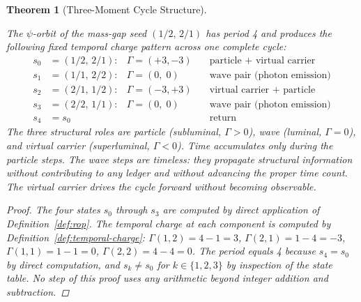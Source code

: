 \documentclass[11pt, letterpaper]{article}
\newcommand{\Tcharge}{\Gamma}
\theoremstyle{definition}
\theoremstyle{plain}
\newtheorem{theorem}{Theorem}[section]
\begin{document}
\begin{theorem}[Three-Moment Cycle Structure]\label{thm:three-moment}
\begin{rsbox}
The $\psi$-orbit of the mass-gap seed $(1/2,\, 2/1)$ has period 4 and produces
the following fixed temporal charge pattern across one complete cycle:
\begin{align*}
s_0 &= (1/2,\, 2/1): & \Tcharge = (+3, -3) & \quad \text{particle + virtual carrier} \\
s_1 &= (1/1,\, 2/2): & \Tcharge = (0,\; 0) & \quad \text{wave pair (photon emission)} \\
s_2 &= (2/1,\, 1/2): & \Tcharge = (-3, +3) & \quad \text{virtual carrier + particle} \\
s_3 &= (2/2,\, 1/1): & \Tcharge = (0,\; 0) & \quad \text{wave pair (photon emission)} \\
s_4 &= s_0 & & \quad \text{return}
\end{align*}
The three structural roles are particle (subluminal, $\Tcharge > 0$), wave
(luminal, $\Tcharge = 0$), and virtual carrier (superluminal, $\Tcharge < 0$).
Time accumulates only during the particle steps.  The wave steps are timeless:
they propagate structural information without contributing to any ledger and
without advancing the proper time count.  The virtual carrier drives the cycle
forward without becoming observable.
\end{rsbox}
\begin{proof}
The four states $s_0$ through $s_3$ are computed by direct application of
Definition~\ref{def:rop}.  The temporal charge at each component is computed by
Definition~\ref{def:temporal-charge}: $\Tcharge(1,2) = 4-1 = 3$,
$\Tcharge(2,1) = 1-4 = -3$, $\Tcharge(1,1) = 1-1 = 0$, $\Tcharge(2,2) = 4-4
= 0$.  The period equals 4 because $s_4 = s_0$ by direct computation, and $s_k
\neq s_0$ for $k \in \{1, 2, 3\}$ by inspection of the state table.  No step of
this proof uses any arithmetic beyond integer addition and subtraction.
\end{proof}
\end{theorem}
\end{document}
